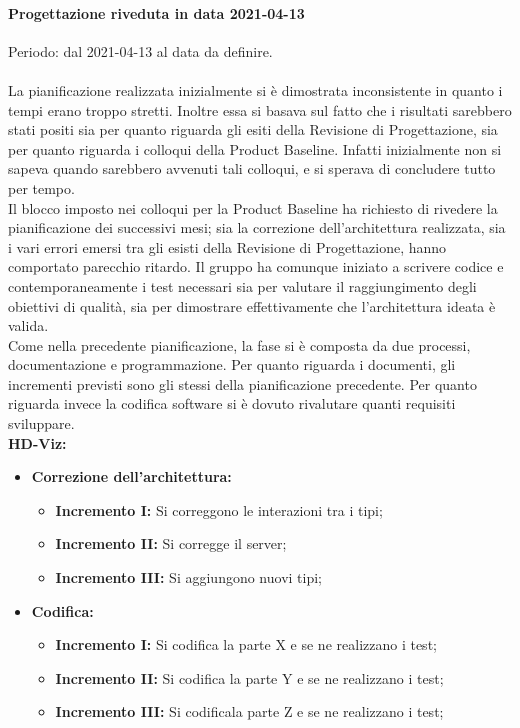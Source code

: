 \documentclass[../piano_di_progetto.tex]{subfiles}
\begin{document}
\paragraph{Progettazione riveduta in data 2021-04-13}
Periodo: dal 2021-04-13 al data da definire.\\ \\
La pianificazione realizzata inizialmente si è dimostrata inconsistente in quanto i tempi erano troppo stretti. Inoltre essa si basava sul fatto che i risultati sarebbero stati 
positi sia per quanto riguarda gli esiti della Revisione di Progettazione, sia per quanto riguarda i colloqui della Product Baseline. Infatti inizialmente non si sapeva quando sarebbero
avvenuti tali colloqui, e si sperava di concludere tutto per tempo.\\
Il blocco imposto nei colloqui per la Product Baseline ha richiesto di rivedere la pianificazione dei successivi mesi; sia la correzione dell'architettura realizzata, 
sia i vari errori emersi tra gli esisti della Revisione di Progettazione, hanno comportato parecchio ritardo. Il gruppo ha comunque iniziato a scrivere codice e contemporaneamente 
i test necessari sia per valutare il raggiungimento degli obiettivi di qualità, sia per dimostrare effettivamente che l'architettura ideata è valida. \\
Come nella precedente pianificazione, la fase si è composta da due processi, documentazione e programmazione. Per quanto riguarda i documenti, gli incrementi previsti 
sono gli stessi della pianificazione precedente. Per quanto riguarda invece la codifica software si è dovuto rivalutare quanti requisiti sviluppare. \\

\textbf{HD-Viz:}
\begin{itemize}
    \item \textbf{Correzione dell'architettura:}
    \begin{itemize}
        \item \textbf{Incremento I:} Si correggono le interazioni tra i tipi;
        \item \textbf{Incremento II:} Si corregge il server;
        \item \textbf{Incremento III:} Si aggiungono nuovi tipi;
    \end{itemize}
    \item \textbf{Codifica:}
    \begin{itemize}
        \item \textbf{Incremento I:} Si codifica la parte X e se ne realizzano i test;
        \item \textbf{Incremento II:} Si codifica la parte Y e se ne realizzano i test;
        \item \textbf{Incremento III:} Si codificala parte Z e se ne realizzano i test;
    \end{itemize}
\end{itemize}
\end{document}

